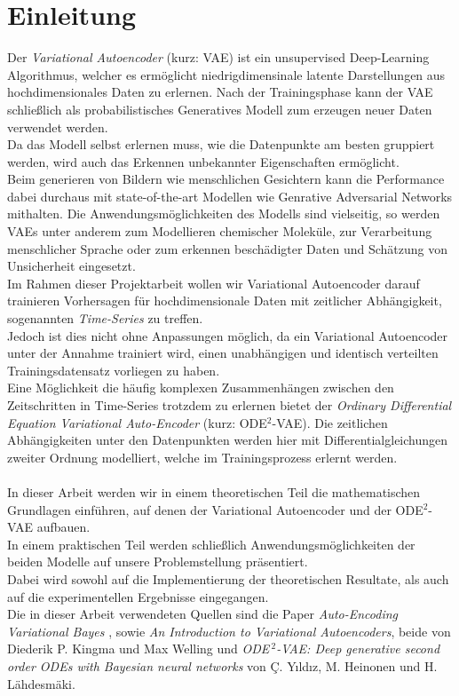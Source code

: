 \documentclass[12pt]{article}
\begin{document}
	\tableofcontents
	\newpage
	\section[Einleitung]{Einleitung}
	Der \emph{Variational Autoencoder} (kurz: VAE) ist ein unsupervised Deep-Learning Algorithmus, welcher es ermöglicht niedrigdimensinale latente Darstellungen aus hochdimensionales Daten zu erlernen. Nach der Trainingsphase kann der VAE schließlich als probabilistisches Generatives Modell zum erzeugen neuer Daten verwendet werden.\\
	Da das Modell selbst erlernen muss, 
	wie die Datenpunkte am besten gruppiert werden, wird auch das Erkennen unbekannter Eigenschaften ermöglicht.\\
	Beim generieren von Bildern wie menschlichen Gesichtern kann die Performance dabei durchaus mit state-of-the-art Modellen wie Genrative Adversarial Networks mithalten. Die Anwendungsmöglichkeiten des Modells sind vielseitig, so werden VAEs unter anderem zum Modellieren chemischer Moleküle, zur Verarbeitung menschlicher Sprache oder zum erkennen beschädigter Daten und Schätzung von Unsicherheit eingesetzt.\\
	Im Rahmen dieser Projektarbeit wollen wir Variational Autoencoder darauf trainieren Vorhersagen für hochdimensionale Daten mit zeitlicher Abhängigkeit, sogenannten \emph{Time-Series} zu treffen.\\
	Jedoch ist dies nicht ohne Anpassungen möglich, da ein Variational Autoencoder unter der Annahme trainiert wird, einen unabhängigen und identisch verteilten Trainingsdatensatz vorliegen zu haben.\\ 
	Eine Möglichkeit die häufig komplexen Zusammenhängen zwischen den Zeitschritten in Time-Series trotzdem zu erlernen bietet der \emph{Ordinary Differential Equation Variational Auto-Encoder} (kurz: ODE$^2$-VAE). Die zeitlichen Abhängigkeiten unter den Datenpunkten werden hier mit Differentialgleichungen zweiter Ordnung modelliert, welche im Trainingsprozess erlernt werden. \\
	\\
	In dieser Arbeit werden wir in einem theoretischen Teil die mathematischen Grundlagen einführen, auf denen der Variational Autoencoder und der ODE$^2$-VAE aufbauen.\\ 
	In einem praktischen Teil werden schließlich Anwendungsmöglichkeiten der beiden Modelle auf unsere Problemstellung präsentiert.\\
	Dabei wird sowohl auf die Implementierung der
	theoretischen Resultate, als auch auf die experimentellen Ergebnisse eingegangen.\\
	Die in dieser Arbeit verwendeten Quellen sind die Paper \emph{Auto-Encoding Variational Bayes} \cite{vae}, sowie \emph{An Introduction to Variational Autoencoders}, \cite{intvae} beide von Diederik P. Kingma und Max Welling und \emph{ODE$^{\ 2}$-VAE: Deep generative second order ODEs with Bayesian neural networks} \cite{ode2vae} von Ç. Yıldız, M. Heinonen und H. Lähdesmäki.
	\newpage
	
\end{document}
